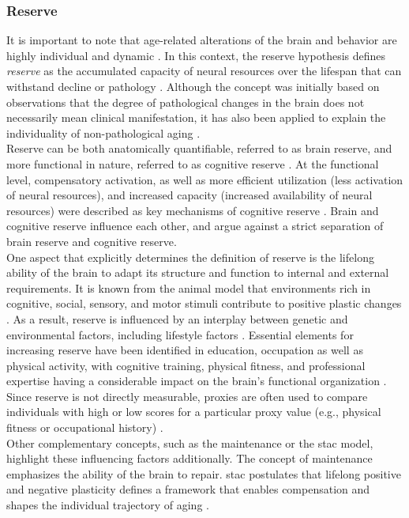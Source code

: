\subsubsection{Reserve}
\label{theory:aging:reserve}
It is important to note that age-related alterations of the brain and behavior are highly individual and dynamic \cite{Smith2020,Koen2019,Douw2014}. In this context, the reserve hypothesis defines \textit{reserve} as the accumulated capacity of neural resources over the lifespan that can withstand decline or pathology \cite{Cabeza2018, Stern2009}. Although the concept was initially based on observations that the degree of pathological changes in the brain does not necessarily mean clinical manifestation, it has also been applied to explain the individuality of non-pathological aging \cite{Esiri2001,Cabeza2018,Stern2009}.\\
Reserve can be both anatomically quantifiable, referred to as brain reserve, and more functional in nature, referred to as cognitive reserve \cite{Stern2009}. At the functional level, compensatory activation, as well as more efficient utilization (less activation of neural resources), and increased capacity (increased availability of neural resources) were described as key mechanisms of cognitive reserve \cite{Stern2004,Stern2009}. Brain and cognitive reserve influence each other, and \citeauthor{Cabeza2018} \cite{Cabeza2018} argue against a strict separation of brain reserve and cognitive reserve.\\
One aspect that explicitly determines the definition of reserve is the lifelong ability of the brain to adapt its structure and function to internal and external requirements. It is known from the animal model that environments rich in cognitive, social, sensory, and motor stimuli contribute to positive plastic changes \cite{Fabel2009}. As a result, reserve is influenced by an interplay between genetic and environmental factors, including lifestyle factors \cite{Cabeza2018}. Essential elements for increasing reserve have been identified in education, occupation as well as physical activity, with cognitive training, physical fitness, and professional expertise having a considerable impact on the brain's functional organization \cite{vieluf2018age,VOSS2016113,Soldan2021}. Since reserve is not directly measurable, proxies are often used to compare individuals with high or low scores for a particular proxy value (e.g., physical fitness or occupational history) \cite{Cabeza2018}.\\
Other complementary concepts, such as the maintenance or the \gls{stac} model, highlight these influencing factors additionally. The concept of maintenance emphasizes the ability of the brain to repair. \Gls{stac} postulates that lifelong positive and negative plasticity defines a framework that enables compensation and shapes the individual trajectory of aging \cite{Reuter-Lorenz2014}. 

